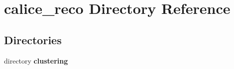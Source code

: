 \section{calice\-\_\-reco Directory Reference}
\label{dir_aa5152576b83acadfecf1e9f3e210c0e}
\subsection*{Directories}
\begin{DoxyCompactItemize}
\item 
directory {\bf clustering}
\end{DoxyCompactItemize}
